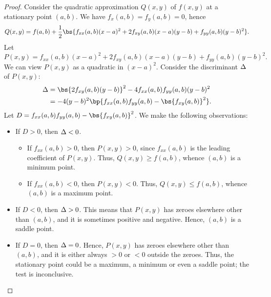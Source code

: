 \begin{proof}
    Consider the quadratic approximation $Q(x, y)$ of $f(x, y)$ at a stationary point $(a, b)$. We have $f_x(a, b) = f_y(a, b) = 0$, hence \[Q(x, y) = f(a, b) + \frac12 \bs{f_{xx} (a, b) (x-a)^2 + 2 f_{xy}(a, b) (x-a)(y-b) + f_{yy}(a, b) (y-b)^2}.\] Let \[P(x, y) = f_{xx} (a, b) (x-a)^2 + 2 f_{xy}(a, b) (x-a)(y-b) + f_{yy}(a, b) (y-b)^2.\] We can view $P(x, y)$ as a quadratic in $(x-a)^2$. Consider the discriminant $\Delta$ of $P(x, y)$:
    \begin{align*}
        \D &= \bs{2 f_{xy}(a, b) (y-b)}^2 - 4 f_{xx} (a, b) f_{yy}(a, b) (y-b)^2\\
        &= -4(y-b)^2 \bp{f_{xx}(a, b)f_{yy}(a, b) - \bs{f_{xy}(a, b)}^2}.
    \end{align*}
    Let $D = f_{xx}(a, b)f_{yy}(a, b) - \bs{f_{xy}(a, b)}^2$. We make the following observations:
    \begin{itemize}
        \item If $D > 0$, then $\Delta < 0$.
        \begin{itemize}
            \item If $f_{xx}(a, b) > 0$, then $P(x, y) > 0$, since $f_{xx}(a, b)$ is the leading coefficient of $P(x, y)$. Thus, $Q(x, y) \geq f(a, b)$, whence $(a, b)$ is a minimum point.
            \item If $f_{xx}(a, b) < 0$, then $P(x, y) < 0$. Thus, $Q(x, y) \leq f(a, b)$, whence $(a, b)$ is a maximum point.
        \end{itemize}
        \item If $D < 0$, then $\Delta > 0$. This means that $P(x, y)$ has zeroes elsewhere other than $(a, b)$, and it is sometimes positive and negative. Hence, $(a, b)$ is a saddle point.
        \item If $D = 0$, then $\Delta = 0$. Hence, $P(x, y)$ has zeroes elsewhere other than $(a, b)$, and it is either always $> 0$ or $< 0$ outside the zeroes. Thus, the stationary point could be a maximum, a minimum or even a saddle point; the test is inconclusive.
    \end{itemize}
\end{proof}